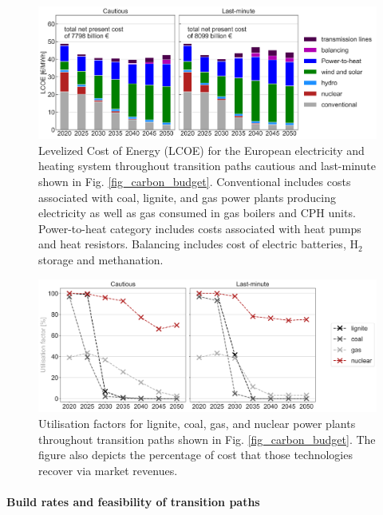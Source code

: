 \documentclass[5p]{elsarticle} %
\begin{document}
\begin{figure}[!h]
\centering
\includegraphics[width=14cm]{figures/LCOE_Base.png}
\caption{Levelized Cost of Energy (LCOE) for the European electricity and heating system throughout transition paths cautious and last-minute shown in Fig. \ref{fig_carbon_budget}. Conventional includes costs associated with coal, lignite, and gas power plants producing electricity as well as gas consumed in gas boilers and CPH units. Power-to-heat category includes costs associated with heat pumps and heat resistors. Balancing includes cost of electric batteries, H$_2$ storage and methanation. } \label{fig_system_cost} 
\end{figure}

\begin{figure}[!h]
\centering
\includegraphics[width=\columnwidth]{figures/utilisation_factors_Base.png}
\caption{Utilisation factors for lignite, coal, gas, and nuclear power plants throughout transition paths shown in Fig. \ref{fig_carbon_budget}. The figure also depicts the percentage of cost that those technologies recover via market revenues. } \label{fig_utilisation_factors} 

\end{figure}

\paragraph{\textbf{Build rates and feasibility of transition paths}} \
\end{document}

